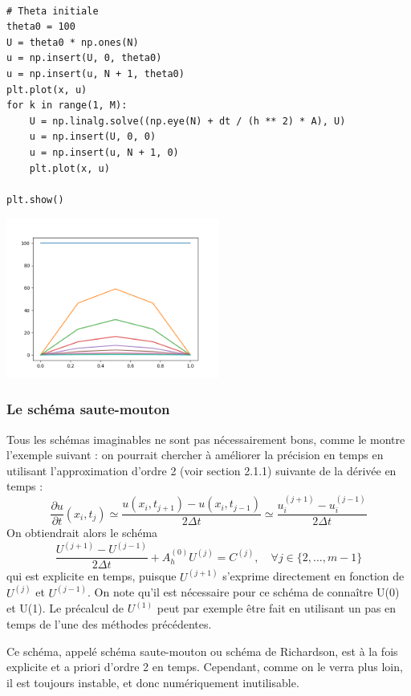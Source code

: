 \documentclass{beamer}
\begin{document}
 \begin{frame}[fragile] 
\begin{verbatim}

# Theta initiale
theta0 = 100
U = theta0 * np.ones(N)
u = np.insert(U, 0, theta0)
u = np.insert(u, N + 1, theta0)
plt.plot(x, u)
for k in range(1, M):
    U = np.linalg.solve((np.eye(N) + dt / (h ** 2) * A), U)
    u = np.insert(U, 0, 0)
    u = np.insert(u, N + 1, 0)
    plt.plot(x, u)

plt.show()
  \end{verbatim}

\end{frame}

\begin{frame}
 \begin{center}
\includegraphics[width=7cm]{chaleur2.png}
\end{center}
\end{frame}
  
   
  
  
  
 \begin{frame}    
  \frametitle{ Le schéma saute-mouton}
Tous les schémas imaginables ne sont pas nécessairement bons, comme le montre l'exemple suivant : on pourrait chercher à améliorer la précision en temps en utilisant l'approximation d'ordre 2 (voir section 2.1.1) suivante de la dérivée en temps :
\[\frac{\partial u}{\partial t}(x_i,t_j) \simeq \frac{u(x_{i},t_{j+1})-u(x_{i},t_{j-1})}{2\Delta t}\simeq
\frac{u_{i}^{(j+1)}-u_{i}^{(j-1)} }{2\Delta t}\]
On obtiendrait alors le schéma
 \begin{equation}
   \frac{U^{(j+1)}-U^{(j-1)} }{2\Delta t} +A_h^{(0)}U^{(j)} =C^{(j)} , \quad \forall j\in\{2,...,m-1\} 
   \end{equation}
 qui est explicite en temps, puisque $U^{(j+1)}$ s'exprime directement en fonction de $U^{(j)}$ et $U^{(j-1)}$. On note qu'il est nécessaire pour ce schéma de connaître U(0) et U(1). Le précalcul de $U^{(1)}$ peut par exemple être fait en utilisant un pas en temps de l'une des méthodes précédentes.
 
Ce schéma, appelé schéma saute-mouton ou schéma de Richardson, est à la fois explicite et a priori d'ordre 2 en temps. Cependant, comme on le verra plus loin, il est toujours instable, et donc numériquement inutilisable.
  \end{frame}
  
\end{document}
